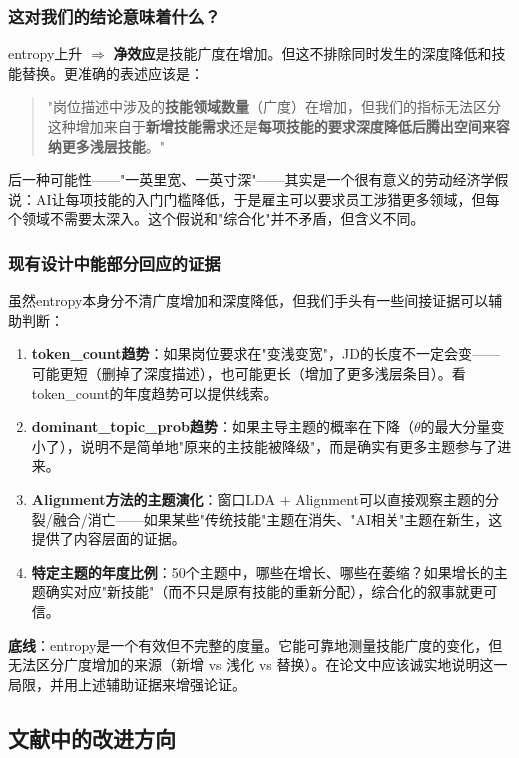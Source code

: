 \documentclass[12pt,a4paper]{ctexart}
\begin{document}
\subsubsection{这对我们的结论意味着什么？}

entropy上升 $\Rightarrow$ \textbf{净效应}是技能广度在增加。但这不排除同时发生的深度降低和技能替换。更准确的表述应该是：

\begin{quote}
"岗位描述中涉及的\textbf{技能领域数量}（广度）在增加，但我们的指标无法区分这种增加来自于\textbf{新增技能需求}还是\textbf{每项技能的要求深度降低后腾出空间来容纳更多浅层技能}。"
\end{quote}

后一种可能性——"一英里宽、一英寸深"——其实是一个很有意义的劳动经济学假说：AI让每项技能的入门门槛降低，于是雇主可以要求员工涉猎更多领域，但每个领域不需要太深入。这个假说和"综合化"并不矛盾，但含义不同。

\subsubsection{现有设计中能部分回应的证据}

虽然entropy本身分不清广度增加和深度降低，但我们手头有一些间接证据可以辅助判断：

\begin{enumerate}
\item \textbf{token\_count趋势}：如果岗位要求在"变浅变宽"，JD的长度不一定会变——可能更短（删掉了深度描述），也可能更长（增加了更多浅层条目）。看token\_count的年度趋势可以提供线索。
\item \textbf{dominant\_topic\_prob趋势}：如果主导主题的概率在下降（$\theta$的最大分量变小了），说明不是简单地"原来的主技能被降级"，而是确实有更多主题参与了进来。
\item \textbf{Alignment方法的主题演化}：窗口LDA + Alignment可以直接观察主题的分裂/融合/消亡——如果某些"传统技能"主题在消失、"AI相关"主题在新生，这提供了内容层面的证据。
\item \textbf{特定主题的年度比例}：50个主题中，哪些在增长、哪些在萎缩？如果增长的主题确实对应"新技能"（而不只是原有技能的重新分配），综合化的叙事就更可信。
\end{enumerate}

\textbf{底线}：entropy是一个有效但不完整的度量。它能可靠地测量技能广度的变化，但无法区分广度增加的来源（新增 vs 浅化 vs 替换）。在论文中应该诚实地说明这一局限，并用上述辅助证据来增强论证。

\subsection{文献中的改进方向}
\end{document}
